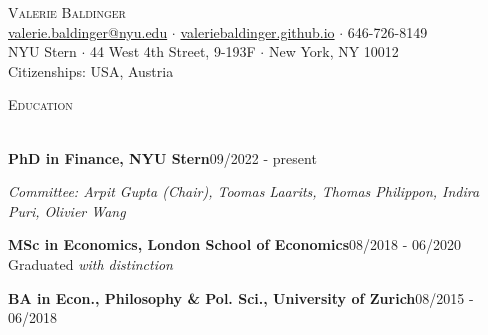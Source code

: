 \documentclass[11pt,a4paper]{article}
\newcommand{\header}[1]{
  {\hspace*{-18pt}\vspace*{6pt}\textsc{#1}}
  \vspace*{-6pt}\lineunder
  \vspace{2mm}
}
\newcommand{\lineunder}{
  \vspace*{-8pt}\\
  \hspace*{-18pt}\hrulefill\\
}
\begin{document}
\enlargethispage{2\baselineskip}
\vspace*{-52.5pt}

\vspace*{-10pt}
\begin{center}
  {\LARGE\scshape Valerie Baldinger}\\[2pt]
  \small
  \href{mailto:valerie.baldinger@nyu.edu}{valerie.baldinger@nyu.edu} $\cdot$
  \href{https://valeriebaldinger.github.io/}{valeriebaldinger.github.io} $\cdot$ 646-726-8149\\[2pt]
  NYU Stern $\cdot$ 44 West 4th Street, 9-193F $\cdot$ New York, NY 10012\\[1pt]
  Citizenships: USA, Austria
\end{center}
\vspace{-1mm}

\header{Education}
\textbf{PhD in Finance, NYU Stern}\hfill 09/2022 - present\\
{\small\textit{Committee: Arpit Gupta (Chair), Toomas Laarits, Thomas Philippon, Indira Puri, Olivier Wang}\par}
\vspace{1mm}

\textbf{MSc in Economics, London School of Economics}\hfill 08/2018 - 06/2020\\
Graduated \textit{with distinction}
\vspace{1mm}

\textbf{BA in Econ., Philosophy \& Pol. Sci., University of Zurich}\hfill 08/2015 - 06/2018\\
\vspace{1mm}
\end{document}
